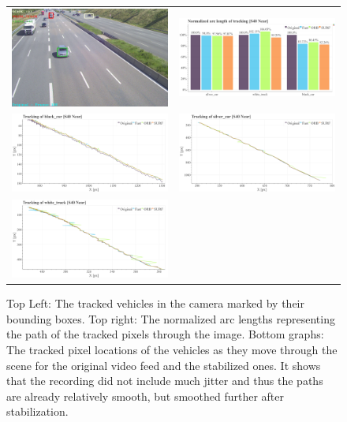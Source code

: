\begin{figure}[!ht]
  \centering
  \begin{tabular}{cc}
    \includegraphics[width=0.45\linewidth]{diagrams/object_tracking/s40_n_near/frame.png}    &  
    \includegraphics[width=0.475\linewidth]{diagrams/object_tracking/s40_n_near/normalized_arc_lengths.html.png}    \\

    \includegraphics[width=0.475\linewidth]{diagrams/object_tracking/s40_n_near/black_car.png}    &  
    \includegraphics[width=0.475\linewidth]{diagrams/object_tracking/s40_n_near/silver_car.png}    \\  
    \includegraphics[width=0.475\linewidth]{diagrams/object_tracking/s40_n_near/white_truck.png}   
  \end{tabular}
  \caption{Top Left:
  The tracked vehicles in the camera  marked by their bounding boxes. 
  Top right: 
  The normalized arc lengths representing the path of the tracked pixels through the image.
  Bottom graphs:
  The tracked pixel locations of the vehicles as they move through the scene for the original video feed and the stabilized ones.
  It shows that the recording did not include much jitter and thus the paths are already relatively smooth, but smoothed further after stabilization.
   }
  \label{fig:object_tracking_appendix_s40_n_near}
\end{figure}



